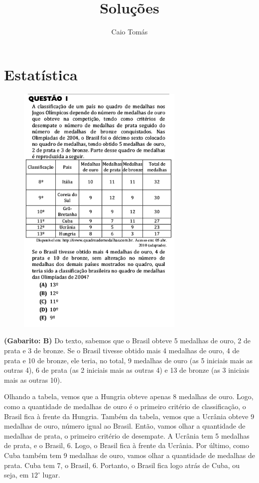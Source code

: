 \documentclass[a4paper]{article}
\title{Soluções}
\date{}
\author{Caio Tomás}
\begin{document}
	\maketitle
	\tableofcontents
	\newpage
	\section{Estatística}
	\begin{figure}[H]
		\begin{center}
			\includegraphics[width=8cm]{L1Q1.png}
		\end{center}
	\end{figure}
\par\textbf{(Gabarito: B)} Do texto, sabemos que o Brasil obteve 5 medalhas de ouro, 2 de prata e 3 de bronze. Se o Brasil tivesse obtido mais 4 medalhas de ouro, 4 de prata e 10 de bronze, ele teria, no total, 9 medalhas de ouro (as 5 iniciais mais as outras 4), 6 de prata (as 2 iniciais mais as outras 4) e 13 de bronze (as 3 iniciais mais as outras 10).
\par\vspace{0.3cm} Olhando a tabela, vemos que a Hungria obteve apenas 8 medalhas de ouro. Logo, como a quantidade de medalhas de ouro é o primeiro critério de classificação, o Brasil fica à frente da Hungria. Também da tabela, vemos que a Ucrânia obteve 9 medalhas de ouro, número igual ao Brasil. Então, vamos olhar a quantidade de medalhas de prata, o primeiro critério de desempate. A Ucrânia tem 5 medalhas de prata, e o Brasil, 6. Logo, o Brasil fica à frente da Ucrânia. Por último, como Cuba também tem 9 medalhas de ouro, vamos olhar a quantidade de medalhas de prata. Cuba tem 7, o Brasil, 6. Portanto, o Brasil fica logo atrás de Cuba, ou seja, em $12^{\circ}$ lugar. 
\end{document}
